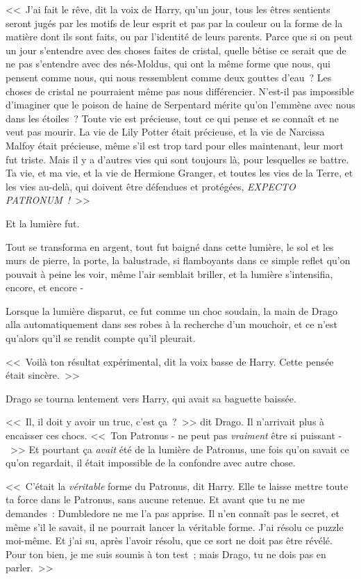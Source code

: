 <<~J'ai fait le rêve, dit la voix de Harry, qu'un jour, tous les êtres sentients\footnotemark{} seront jugés par les motifs de leur esprit et pas par la couleur ou la forme de la matière dont ils sont faits, ou par l'identité de leurs parents. Parce que si on peut un jour s'entendre avec des choses faites de cristal, quelle bêtise ce serait que de ne pas s'entendre avec des nés-Moldus, qui ont la même forme que nous, qui pensent comme nous, qui nous ressemblent comme deux gouttes d'eau~? Les choses de cristal ne pourraient même pas nous différencier. N'est-il pas impossible d'imaginer que le poison de haine de Serpentard mérite qu'on l'emmène avec nous dans les étoiles~? Toute vie est précieuse, tout ce qui pense et se connaît et ne veut pas mourir. La vie de Lily Potter était précieuse, et la vie de Narcissa Malfoy était précieuse, même s'il est trop tard pour elles maintenant, leur mort fut triste. Mais il y a d'autres vies qui sont toujours là, pour lesquelles se battre. Ta vie, et ma vie, et la vie de Hermione Granger, et toutes les vies de la Terre, et les vies au-delà, qui doivent être défendues et protégées, \emph{EXPECTO PATRONUM~!}~>>

Et la lumière fut.

Tout se transforma en argent, tout fut baigné dans cette lumière, le sol et les murs de pierre, la porte, la balustrade, si flamboyants dans ce simple reflet qu'on pouvait à peine les voir, même l'air semblait briller, et la lumière s'intensifia, encore, et encore -

Lorsque la lumière disparut, ce fut comme un choc soudain, la main de Drago alla automatiquement dans ses robes à la recherche d'un mouchoir, et ce n'est qu'alors qu'il se rendit compte qu'il pleurait.

<<~Voilà ton résultat expérimental, dit la voix basse de Harry. Cette pensée était sincère.~>>

Drago se tourna lentement vers Harry, qui avait sa baguette baissée.

<<~Il, il doit y avoir un truc, c'est ça~?~>> dit Drago. Il n'arrivait plus à encaisser ces chocs. <<~Ton Patronus - ne peut pas \emph{vraiment} être si puissant -~>> Et pourtant ça \emph{avait} été de la lumière de Patronus, une fois qu'on savait ce qu'on regardait, il était impossible de la confondre avec autre chose.

<<~C'était la \emph{véritable} forme du Patronus, dit Harry. Elle te laisse mettre toute ta force dans le Patronus, sans aucune retenue. Et avant que tu ne me demandes~: Dumbledore ne me l'a pas apprise. Il n'en connaît pas le secret, et même s'il le savait, il ne pourrait lancer la véritable forme. J'ai résolu ce puzzle moi-même. Et j'ai su, après l'avoir résolu, que ce sort ne doit pas être révélé. Pour ton bien, je me suis soumis à ton test~; mais Drago, tu ne dois pas en parler.~>>

